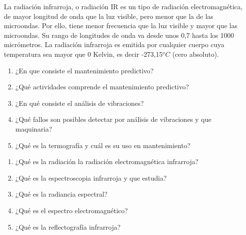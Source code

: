 \documentclass[../main]{subfiles}
\begin{document}
La radiación infrarroja, o radiación IR es un tipo de radiación electromagnética, de mayor longitud de onda que la luz visible, pero menor que la de las microondas. Por ello, tiene menor frecuencia que la luz visible y mayor que las microondas. Su rango de longitudes de onda va desde unos 0,7 hasta los 1000 micrómetros. La radiación infrarroja es emitida por cualquier cuerpo cuya temperatura sea mayor que 0 Kelvin, es decir -273,15$^oC$ (cero absoluto).


\newpage

\begin{enumerate}
    \item ¿En que consiste el mantenimiento predictivo?
    \item ¿Qué actividades comprende el mantenimiento predictivo?
    \item ¿En qué consiste el análisis de vibraciones?
    \item ¿Qué fallos son posibles detectar por análisis de vibraciones y que maquinaria?
    \item ¿Qué es la termografía y cuál es su uso en mantenimiento?
\end{enumerate}
\begin{enumerate}
     \item ¿Qué es la radiación la radiación electromagnética infrarroja?
     \item ¿Qué es la espectroscopia infrarroja y que estudia?
     \item ¿Qué es la radiancia espectral?
     \item ¿Qué es el espectro electromagnético?
     \item ¿Qué es la reflectografía infrarroja?
    
\end{enumerate}
\end{document}
